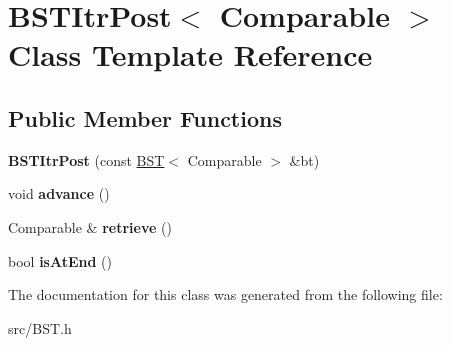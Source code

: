 \hypertarget{class_b_s_t_itr_post}{}\section{B\+S\+T\+Itr\+Post$<$ Comparable $>$ Class Template Reference}
\label{class_b_s_t_itr_post}
\subsection*{Public Member Functions}
\begin{DoxyCompactItemize}
\item 
\hypertarget{class_b_s_t_itr_post_acf7e537dea01978f40c40909c55c56c2}{}{\bfseries B\+S\+T\+Itr\+Post} (const \hyperlink{class_b_s_t}{B\+S\+T}$<$ Comparable $>$ \&bt)\label{class_b_s_t_itr_post_acf7e537dea01978f40c40909c55c56c2}

\item 
\hypertarget{class_b_s_t_itr_post_a376098e5a82cd02118dd4dcdec49bb26}{}void {\bfseries advance} ()\label{class_b_s_t_itr_post_a376098e5a82cd02118dd4dcdec49bb26}

\item 
\hypertarget{class_b_s_t_itr_post_a72446e4d0df0bcafc14294a78faeb56e}{}Comparable \& {\bfseries retrieve} ()\label{class_b_s_t_itr_post_a72446e4d0df0bcafc14294a78faeb56e}

\item 
\hypertarget{class_b_s_t_itr_post_a2f330e73bb817e8bd1c797805e66ddb7}{}bool {\bfseries is\+At\+End} ()\label{class_b_s_t_itr_post_a2f330e73bb817e8bd1c797805e66ddb7}

\end{DoxyCompactItemize}


The documentation for this class was generated from the following file\+:\begin{DoxyCompactItemize}
\item 
src/B\+S\+T.\+h\end{DoxyCompactItemize}
